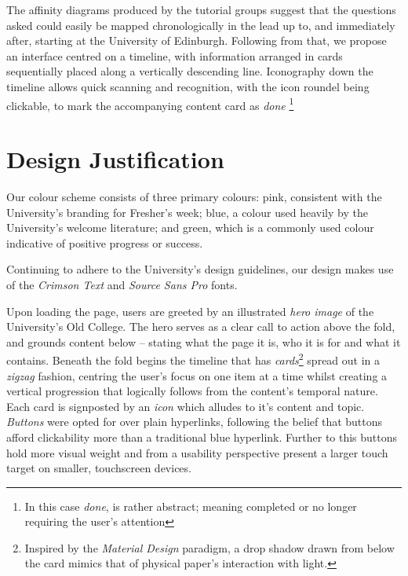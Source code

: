\documentclass[a4paper, notoc]{tufte-handout}
\begin{document}
The affinity diagrams produced by the tutorial groups suggest that the questions asked could easily be mapped chronologically in the lead up to, and immediately after, starting at the University of Edinburgh. Following from that, we propose an interface centred on a timeline, with information arranged in cards sequentially placed along a vertically descending line. Iconography down the timeline allows quick scanning and recognition, with the icon roundel being clickable, to mark the accompanying content card as \textit{done}
\footnote{In this case \textit{done}, is rather abstract; meaning completed or no longer requiring the user's attention}


\section{Design Justification}\label{sec:design-justification}

Our colour scheme consists of three primary colours: pink, consistent with the University's branding for Fresher's week; blue, a colour used heavily by the University's welcome literature; and green, which is a commonly used colour indicative of positive progress or success.

Continuing to adhere to the University's design guidelines, our design makes use of the \textit{Crimson Text} and \textit{Source Sans Pro} fonts.

Upon loading the page, users are greeted by an illustrated \textit{hero image} of the University's Old College. The hero serves as a clear call to action above the fold, and grounds content below -- stating what the page it is, who it is for and what it contains. Beneath the fold begins the timeline that has \textit{cards}\footnote{Inspired by the \textit{Material Design} paradigm, a drop shadow drawn from below the card mimics that of physical paper's interaction with light.} spread out in a \textit{zigzag} fashion, centring the user's focus on one item at a time whilst creating a vertical progression that logically follows from the content's temporal nature. Each card is signposted by an \textit{icon} which alludes to it's content and topic. \textit{Buttons} were opted for over plain hyperlinks, following the belief that buttons afford clickability more than a traditional blue hyperlink. Further to this buttons hold more visual weight and from a usability perspective present a larger touch target on smaller, touchscreen devices.


%
\end{document}
